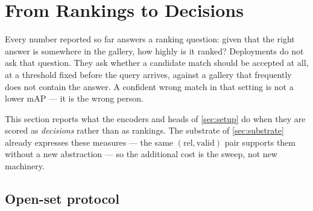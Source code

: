 \section{From Rankings to Decisions}\label{sec:decisions}
%
Every number reported so far answers a ranking question: given that the right answer is
somewhere in the gallery, how highly is it ranked? Deployments do not ask that question. They
ask whether a candidate match should be accepted at all, at a threshold fixed before the query
arrives, against a gallery that frequently does not contain the answer. A confident wrong match
in that setting is not a lower mAP --- it is the wrong person.

This section reports what the encoders and heads of \cref{sec:setup} do when they are scored as
\emph{decisions} rather than as rankings. The substrate of \cref{sec:substrate} already
expresses these measures --- the same $(\mathrm{rel}, \mathrm{valid})$ pair supports them
without a new abstraction --- so the additional cost is the sweep, not new machinery.

\subsection{Open-set protocol}

